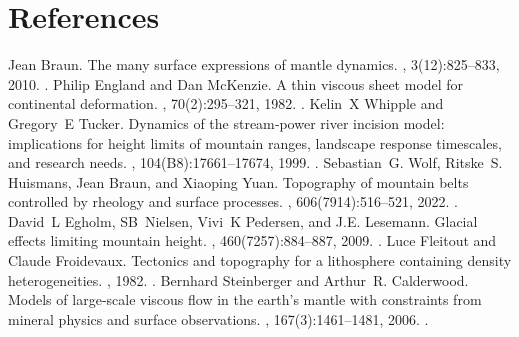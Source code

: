 \documentclass[letterpaper,10pt,english]{jupyterBook}
\begin{document}
\sphinxstepscope


\chapter{References}
\label{\detokenize{references:references}}\label{\detokenize{references::doc}}
\begin{sphinxthebibliography}{10}
\sphinxAtStartPar
Jean Braun. The many surface expressions of mantle dynamics. , 3(12):825–833, 2010. .
\sphinxAtStartPar
Philip England and Dan McKenzie. A thin viscous sheet model for continental deformation. , 70(2):295–321, 1982. .
\sphinxAtStartPar
Kelin X Whipple and Gregory E Tucker. Dynamics of the stream‐power river incision model: implications for height limits of mountain ranges, landscape response timescales, and research needs. , 104(B8):17661–17674, 1999. .
\sphinxAtStartPar
Sebastian G. Wolf, Ritske S. Huismans, Jean Braun, and Xiaoping Yuan. Topography of mountain belts controlled by rheology and surface processes. , 606(7914):516–521, 2022. .
\sphinxAtStartPar
David L Egholm, SB Nielsen, Vivi K Pedersen, and J.\sphinxhyphen{}E. Lesemann. Glacial effects limiting mountain height. , 460(7257):884–887, 2009. .
\sphinxAtStartPar
Luce Fleitout and Claude Froidevaux. Tectonics and topography for a lithosphere containing density heterogeneities. , 1982. .
\sphinxAtStartPar
Bernhard Steinberger and Arthur R. Calderwood. Models of large‐scale viscous flow in the earth's mantle with constraints from mineral physics and surface observations. , 167(3):1461–1481, 2006. .

\end{sphinxthebibliography}
\end{document}
